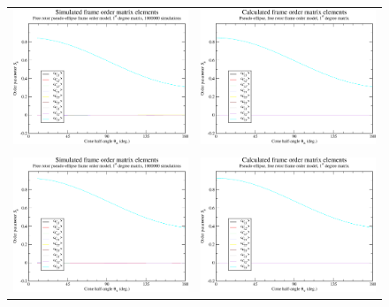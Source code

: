 \begin{figure}
\centering
  \begin{tabular}{@{}cc@{}}
    \includegraphics[width=.5\textwidth]{images/frame_order_matrix/Sij_pseudo-ellipse_free_rotor_in_frame_theta_x_ens1000000.eps} &
    \includegraphics[width=.5\textwidth]{images/frame_order_matrix/Sij_pseudo-ellipse_free_rotor_in_frame_theta_x_calc.eps} \\
    \\[-5pt]
    \includegraphics[width=.5\textwidth]{images/frame_order_matrix/Sij_pseudo-ellipse_free_rotor_in_frame_theta_y_ens1000000.eps} &
    \includegraphics[width=.5\textwidth]{images/frame_order_matrix/Sij_pseudo-ellipse_free_rotor_in_frame_theta_y_calc.eps} \\

\end{tabular}
\end{figure}

